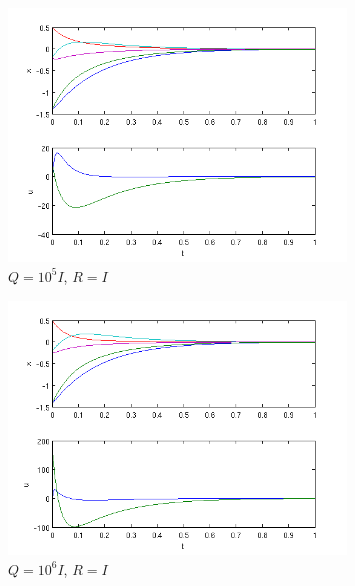 \documentclass[letterpaper,11pt,titlepage]{article}
\begin{document}
\begin{enumerate}[leftmargin=0pt]
\begin{enumerate}
                    \begin{figure}
                        \centering
                        \includegraphics[width=0.8\textwidth]{hw5p3_5}
                        \caption{$Q=10^{5} I$, $R=I$}
                        \label{fig:p3_5}
                    \end{figure}
                    \begin{figure}
                        \centering
                        \includegraphics[width=0.8\textwidth]{hw5p3_6}
                        \caption{$Q=10^{6} I$, $R=I$}
                        \label{fig:p3_6}
                    \end{figure}
        \end{enumerate}

        \clearpage


\end{enumerate}
\end{document}
